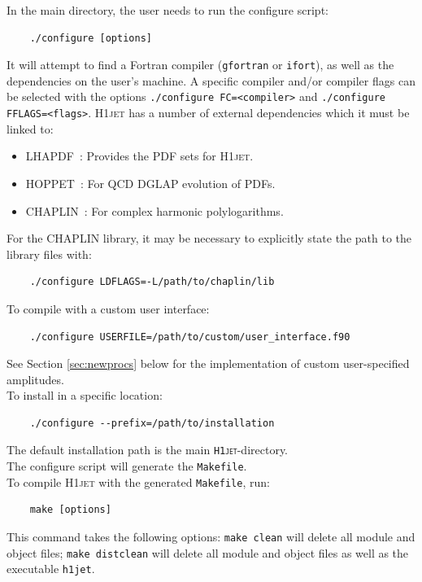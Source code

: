 \documentclass[12pt]{article}
\begin{document}
\noindent
In the main directory, the user needs to run the configure script: 
\begin{lstlisting}
	./configure [options] 
\end{lstlisting}
It will attempt to find a Fortran compiler (\texttt{gfortran} or
\texttt{ifort}), as well as the dependencies on the user's machine. A
specific compiler and/or compiler flags can be selected with the
options \texttt{./configure FC=<compiler>} and \texttt{./configure
  FFLAGS=<flags>}. \textsc{H1jet} has a number of external
dependencies which it must be linked to:
\begin{itemize}
	\item \textsc{LHAPDF}~\cite{Buckley:2014ana}: Provides the PDF sets for \textsc{H1jet}. 
	\item \textsc{HOPPET}~\cite{Salam:2008qg}: For QCD DGLAP evolution of PDFs. 
	\item \textsc{CHAPLIN}~\cite{Buehler:2011ev}: For complex harmonic polylogarithms. 
\end{itemize} 
For the \textsc{CHAPLIN} library, it may be necessary to explicitly state the path to the library files with:
\begin{lstlisting}
	./configure LDFLAGS=-L/path/to/chaplin/lib 
\end{lstlisting}
To compile with a custom user interface: 
\begin{lstlisting}
	./configure USERFILE=/path/to/custom/user_interface.f90  
\end{lstlisting}
See Section \ref{sec:newprocs} below for the implementation of custom user-specified amplitudes. \\ 
To install in a specific location: 
\begin{lstlisting}
	./configure --prefix=/path/to/installation 
\end{lstlisting}
The default installation path is the main \texttt{\textsc{H1jet}}-directory. \\ 
The configure script will generate the \texttt{Makefile}. \\ 
To compile \textsc{H1jet} with the generated \texttt{Makefile}, run: 
\begin{lstlisting}
	make [options] 
\end{lstlisting}
This command takes the following options: \texttt{make clean} will delete all module and object files; \texttt{make distclean} will delete all module and object files as well as the executable \texttt{h1jet}. \\ 
\end{document}
